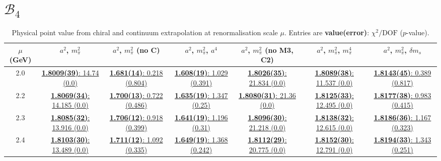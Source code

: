 \documentclass[12pt]{extarticle}
\begin{document}
\section{$\mathcal{B}_4$}
\begin{table}[h!]
\begin{center}
\begin{tabular}{|c|c|c|c|c|c|c|}
\hline
$\mu$ (GeV) & $a^2$, $m_\pi^2$& $a^2$, $m_\pi^2$ (no C)& $a^2$, $m_\pi^2$, $a^4$& $a^2$, $m_\pi^2$ (no M3, C2)& $a^2$, $m_\pi^2$, $m_\pi^4$& $a^2$, $m_\pi^2$, $\delta m_s$\\
\hline
2.0& \hyperlink{SSpPP/SUSY/bag_a2m2_20.pdf.1}{\textbf{1.8009(39)}: 14.74 (0.0)} & \hyperlink{SSpPP/SUSY/bag_a2m2noC_20.pdf.1}{\textbf{1.681(14)}: 0.218 (0.804)} & \hyperlink{SSpPP/SUSY/bag_a2a4m2_20.pdf.1}{\textbf{1.608(19)}: 1.029 (0.391)} & \hyperlink{SSpPP/SUSY/bag_a2m2mcut_20.pdf.1}{\textbf{1.8026(35)}: 21.834 (0.0)} & \hyperlink{SSpPP/SUSY/bag_a2m2m4_20.pdf.1}{\textbf{1.8089(38)}: 11.537 (0.0)} & \hyperlink{SSpPP/SUSY/bag_a2m2delm_20.pdf.1}{\textbf{1.8143(45)}: 0.389 (0.817)}\\
2.2& \hyperlink{SSpPP/SUSY/bag_a2m2_22.pdf.1}{\textbf{1.8069(34)}: 14.185 (0.0)} & \hyperlink{SSpPP/SUSY/bag_a2m2noC_22.pdf.1}{\textbf{1.700(13)}: 0.722 (0.486)} & \hyperlink{SSpPP/SUSY/bag_a2a4m2_22.pdf.1}{\textbf{1.635(19)}: 1.347 (0.25)} & \hyperlink{SSpPP/SUSY/bag_a2m2mcut_22.pdf.1}{\textbf{1.8080(31)}: 21.36 (0.0)} & \hyperlink{SSpPP/SUSY/bag_a2m2m4_22.pdf.1}{\textbf{1.8125(33)}: 12.495 (0.0)} & \hyperlink{SSpPP/SUSY/bag_a2m2delm_22.pdf.1}{\textbf{1.8177(38)}: 0.983 (0.415)}\\
2.3& \hyperlink{SSpPP/SUSY/bag_a2m2_23.pdf.1}{\textbf{1.8085(32)}: 13.916 (0.0)} & \hyperlink{SSpPP/SUSY/bag_a2m2noC_23.pdf.1}{\textbf{1.706(12)}: 0.918 (0.399)} & \hyperlink{SSpPP/SUSY/bag_a2a4m2_23.pdf.1}{\textbf{1.641(19)}: 1.196 (0.31)} & \hyperlink{SSpPP/SUSY/bag_a2m2mcut_23.pdf.1}{\textbf{1.8096(30)}: 21.218 (0.0)} & \hyperlink{SSpPP/SUSY/bag_a2m2m4_23.pdf.1}{\textbf{1.8138(32)}: 12.615 (0.0)} & \hyperlink{SSpPP/SUSY/bag_a2m2delm_23.pdf.1}{\textbf{1.8186(36)}: 1.167 (0.323)}\\
2.4& \hyperlink{SSpPP/SUSY/bag_a2m2_24.pdf.1}{\textbf{1.8103(30)}: 13.489 (0.0)} & \hyperlink{SSpPP/SUSY/bag_a2m2noC_24.pdf.1}{\textbf{1.711(12)}: 1.092 (0.335)} & \hyperlink{SSpPP/SUSY/bag_a2a4m2_24.pdf.1}{\textbf{1.649(19)}: 1.368 (0.242)} & \hyperlink{SSpPP/SUSY/bag_a2m2mcut_24.pdf.1}{\textbf{1.8112(29)}: 20.775 (0.0)} & \hyperlink{SSpPP/SUSY/bag_a2m2m4_24.pdf.1}{\textbf{1.8152(30)}: 12.791 (0.0)} & \hyperlink{SSpPP/SUSY/bag_a2m2delm_24.pdf.1}{\textbf{1.8194(33)}: 1.343 (0.251)}\\
\hline
\end{tabular}
\caption{Physical point value from chiral and continuum extrapolation at renormalisation scale $\mu$. Entries are \textbf{value(error)}: $\chi^2/\text{DOF}$ ($p$-value).}
\end{center}
\end{table}
\end{document}
